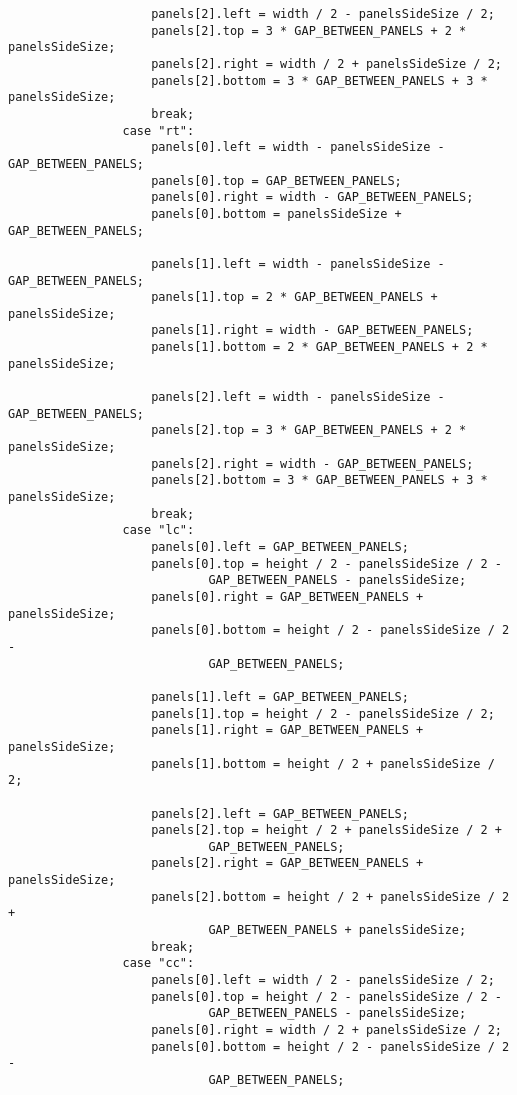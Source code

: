 \begin{verbatim}
                    panels[2].left = width / 2 - panelsSideSize / 2;
                    panels[2].top = 3 * GAP_BETWEEN_PANELS + 2 * panelsSideSize;
                    panels[2].right = width / 2 + panelsSideSize / 2;
                    panels[2].bottom = 3 * GAP_BETWEEN_PANELS + 3 * panelsSideSize;
                    break;
                case "rt":
                    panels[0].left = width - panelsSideSize - GAP_BETWEEN_PANELS;
                    panels[0].top = GAP_BETWEEN_PANELS;
                    panels[0].right = width - GAP_BETWEEN_PANELS;
                    panels[0].bottom = panelsSideSize + GAP_BETWEEN_PANELS;

                    panels[1].left = width - panelsSideSize - GAP_BETWEEN_PANELS;
                    panels[1].top = 2 * GAP_BETWEEN_PANELS + panelsSideSize;
                    panels[1].right = width - GAP_BETWEEN_PANELS;
                    panels[1].bottom = 2 * GAP_BETWEEN_PANELS + 2 * panelsSideSize;

                    panels[2].left = width - panelsSideSize - GAP_BETWEEN_PANELS;
                    panels[2].top = 3 * GAP_BETWEEN_PANELS + 2 * panelsSideSize;
                    panels[2].right = width - GAP_BETWEEN_PANELS;
                    panels[2].bottom = 3 * GAP_BETWEEN_PANELS + 3 * panelsSideSize;
                    break;
                case "lc":
                    panels[0].left = GAP_BETWEEN_PANELS;
                    panels[0].top = height / 2 - panelsSideSize / 2 -
                            GAP_BETWEEN_PANELS - panelsSideSize;
                    panels[0].right = GAP_BETWEEN_PANELS + panelsSideSize;
                    panels[0].bottom = height / 2 - panelsSideSize / 2 -
                            GAP_BETWEEN_PANELS;

                    panels[1].left = GAP_BETWEEN_PANELS;
                    panels[1].top = height / 2 - panelsSideSize / 2;
                    panels[1].right = GAP_BETWEEN_PANELS + panelsSideSize;
                    panels[1].bottom = height / 2 + panelsSideSize / 2;

                    panels[2].left = GAP_BETWEEN_PANELS;
                    panels[2].top = height / 2 + panelsSideSize / 2 +
                            GAP_BETWEEN_PANELS;
                    panels[2].right = GAP_BETWEEN_PANELS + panelsSideSize;
                    panels[2].bottom = height / 2 + panelsSideSize / 2 +
                            GAP_BETWEEN_PANELS + panelsSideSize;
                    break;
                case "cc":
                    panels[0].left = width / 2 - panelsSideSize / 2;
                    panels[0].top = height / 2 - panelsSideSize / 2 -
                            GAP_BETWEEN_PANELS - panelsSideSize;
                    panels[0].right = width / 2 + panelsSideSize / 2;
                    panels[0].bottom = height / 2 - panelsSideSize / 2 -
                            GAP_BETWEEN_PANELS;


\end{verbatim}

